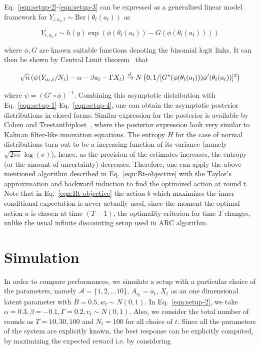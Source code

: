 \documentclass[11pt]{article}
\newcommand{\Acal}{\mathcal{A}}
\begin{document}
Eq.~\eqref{eqn:setup-2}-\eqref{eqn:setup-3} can be expressed as a generalized linear model framework for $Y_{i, a_t, t} \sim \text{Ber}(\theta_t(a_t))$ as 

$$
Y_{i, a_t, t} \sim h(y) \exp\left( \phi(\theta_t(a_t)) - G(\phi(\theta_t(a_t))) \right)
$$

\noindent where $\phi, G$ are known suitable functions denoting the binomial logit links. It can then be shown by Central Limit theorem~\cite{treetanthiploet2021correlated} that 

$$
\sqrt{n}\left( \psi(Y_{a_t, t}/N_t) - \alpha - \beta a_t - \Gamma X_t \right) \xrightarrow{d} N\left( 0, 1/[G"(\phi(\theta_t(a_t)))\phi'(\theta_t(a_t))]^2 \right)
$$

\noindent where $\psi = (G' \circ \phi)^{-1}$. Combining this asymptotic distribution with Eq.~\eqref{eqn:setup-1}-Eq.~\eqref{eqn:setup-4}, one can obtain the asymptotic posterior distributions in closed forms. Similar expression for the posterior is available by Cohen and Treetanthiploet~\cite{treetanthiploet2021correlated}, where the posterior expression look very similar to Kalman filter-like innovation equations. The entropy $H$ for the case of normal distributions turn out to be a increasing function of its variance (namely $\sqrt{2\pi e}\log(\sigma)$), hence, as the precision of the estimates increases, the entropy (or the amount of uncertainty) decreases. Therefore, one can apply the above mentioned algorithm described in Eq.~\eqref{eqn:Rt-objective} with the Taylor's approximation and backward induction to find the optimized action at round $t$. Note that in Eq.~\eqref{eqn:Rt-objective} the action $b$ which maximizes the inner conditional expectation is never actually used, since the moment the optimal action $a$ is chosen at time $(T-1)$, the optimality criterion for time $T$ changes, unlike the usual infinite discounting setup used in ARC algorithm.

\section{Simulation}

In order to compare performances, we simulate a setup with a particular choice of the parameters, namely $\Acal = \{ 1, 2, \dots 10 \}$, $A_{a_t} = a_t$, $X_t$ as an one dimensional latent parameter with $B = 0.5, w_t \sim N(0, 1)$. In Eq.~\eqref{eqn:setup-2}, we take $\alpha = 0.3, \beta = -0.1, \Gamma = 0.2, v_t \sim N(0, 1)$. Also, we consider the total number of rounds as $T = 10, 30, 100$ and $N_t = 100$ for all choice of $t$. Since all the parameters of the system are explicitly known, the best response can be explicitly computed, by maximizing the expected reward i.e. by considering
\end{document}
